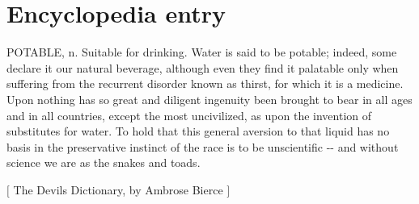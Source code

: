 \section{Encyclopedia entry}
\label{18}

POTABLE, n.  Suitable for drinking.  Water is said to be potable; indeed, some declare it our natural beverage, although even they find it palatable only when suffering from the recurrent disorder known as thirst, for which it is a medicine.  Upon nothing has so great and diligent ingenuity been brought to bear in all ages and in all countries, except the most uncivilized, as upon the invention of substitutes for water.  To hold that this general aversion to that liquid has no basis in the preservative instinct of the race is to be unscientific -{}-{} and without science we are as the snakes and toads.$\text{ }$\newline{}




{$\text{[}$} The Devil\textquotesingle{}s Dictionary, by Ambrose Bierce {$\text{]}$} 
